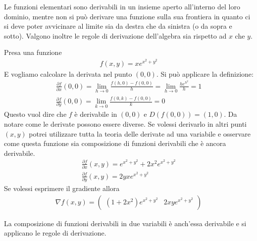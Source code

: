 \documentclass[a4paper, oneside]{book}
\begin{document}
\begin{observation}
    Le funzioni elementari sono derivabili in un insieme aperto all'interno
    del loro dominio, mentre non si può derivare una funzione sulla sua frontiera
    in quanto ci si deve poter avvicinare al limite sia da destra che da sinistra
    (o da sopra e sotto). Valgono inoltre le regole di derivazione dell'algebra sia rispetto ad $x$ che $y$.
\end{observation}
\begin{example}
    Presa una funzione 
    \begin{gather*}
        f(x, y) = xe^{x^{2} + y^{2}  } 
    \end{gather*}
    E vogliamo calcolare la derivata nel punto $(0, 0)$. Si
    può applicare la definizione:
    \begin{gather*}
        \frac{\partial f}{\partial x}(0, 0) = \lim_{h \to 0} \frac{f(h, 0) - f(0, 0)}{h} = \lim_{h \to 0} \frac{he^{h^{2} } }{h} = 1 \\
        \frac{\partial f}{\partial y}(0, 0) = \lim_{k \to 0} \frac{f(0, k) - f(0, 0)}{k} = 0
    \end{gather*}
    Questo vuol dire che $f$ è derivabile in $(0, 0)$ e $D(f(0, 0)) = (1, 0)$. 
    Da notare come le derivate possono essere diverse. Se volessi derivarlo in altri punti $(x, y)$ 
    potrei utilizzare tutta la teoria delle derivate ad una variabile e osservare
    come questa funzione sia composizione di funzioni derivabili che è ancora
    derivabile. 
    \begin{gather*}
        \frac{\partial f}{\partial x}(x, y) = e^{x^{2} + y^{2}  }  + 2x^{2}e^{x^{2} + y^{2}  }  \\
        \frac{\partial f}{\partial y}(x, y) = 2yxe^{x^{2} + y^{2}  }  
    \end{gather*}
    Se volessi esprimere il gradiente allora
    \begin{gather*}
        \nabla f(x, y) = \begin{pmatrix}
            (1 + 2x^{2} )e^{x^{2} + y^{2}  } & 2xye^{x^{2} + y^{2}  } 
        \end{pmatrix}
    \end{gather*}
\end{example}

\begin{observation}
    La composizione di funzioni derivabili in due variabili è anch'essa
    derivabile e si applicano le regole di derivazione.
\end{observation}
\end{document}
